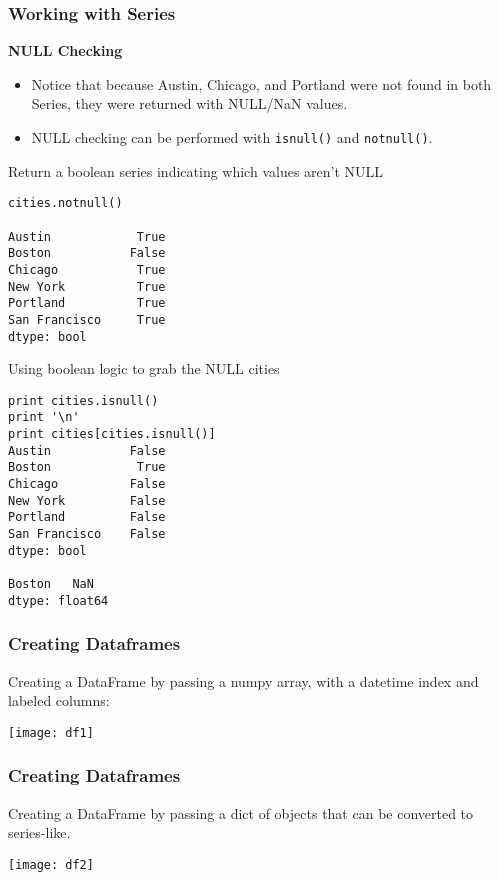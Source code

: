 \begin{frame}[fragile]\frametitle{Working with Series}
\textbf{NULL Checking}
\begin{itemize}
\item Notice that because Austin, Chicago, and Portland were not found in both Series, they were returned with NULL/NaN values.
\item NULL checking can be performed with \texttt{isnull()} and \texttt{notnull()}.
\end{itemize}
\end{frame}

\begin{frame}[fragile]
Return a boolean series indicating which values aren't NULL
\begin{lstlisting}
cities.notnull()

Austin            True
Boston           False
Chicago           True
New York          True
Portland          True
San Francisco     True
dtype: bool
\end{lstlisting}
\end{frame}

\begin{frame}[fragile]
Using boolean logic to grab the NULL cities
\begin{lstlisting}
print cities.isnull()
print '\n'
print cities[cities.isnull()]
Austin           False
Boston            True
Chicago          False
New York         False
Portland         False
San Francisco    False
dtype: bool
			
Boston   NaN
dtype: float64
\end{lstlisting}
\end{frame}

\begin{frame}[fragile]\frametitle{Creating Dataframes}
Creating a DataFrame by passing a numpy array, with a datetime index and labeled columns:
\begin{center}
\texttt{[image: df1]}
\end{center}
\end{frame}


\begin{frame}[fragile]\frametitle{Creating Dataframes}
Creating a DataFrame by passing a dict of objects that can be converted to series-like.
\begin{center}
\texttt{[image: df2]}
\end{center}
\end{frame}

